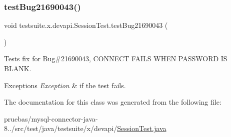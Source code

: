 \subsubsection{\texorpdfstring{test\+Bug21690043()}{testBug21690043()}}
{\footnotesize\ttfamily void testsuite.\+x.\+devapi.\+Session\+Test.\+test\+Bug21690043 (\begin{DoxyParamCaption}{ }\end{DoxyParamCaption})}

Tests fix for Bug\#21690043, C\+O\+N\+N\+E\+CT F\+A\+I\+LS W\+H\+EN P\+A\+S\+S\+W\+O\+RD IS B\+L\+A\+NK.


\begin{DoxyExceptions}{Exceptions}
{\em Exception} & if the test fails. \\
\hline
\end{DoxyExceptions}


The documentation for this class was generated from the following file\+:\begin{DoxyCompactItemize}
\item 
pruebas/mysql-\/connector-\/java-\/8../src/test/java/testsuite/x/devapi/\mbox{\hyperlink{_session_test_8java}{Session\+Test.\+java}}\end{DoxyCompactItemize}
